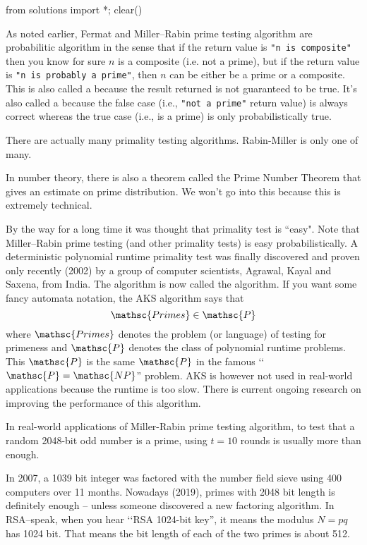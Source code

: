 \begin{python0}
from solutions import *; clear()
\end{python0}

As noted earlier, Fermat and Miller--Rabin prime testing algorithm
are probabilitic algorithm in the sense that if the
return value is \verb!"n is composite"! then you know for sure $n$ is a
composite (i.e. not a prime), 
but if the return value is
\verb!"n is probably a prime"!,
then $n$ can be either be a prime or a
composite.
This is also called a
because the result returned is not guaranteed to be true.
It's also called a  because the
false case (i.e., \verb!"not a prime"! return value) is always correct whereas the
true case (i.e., is a prime) is only probabilistically true.

There are actually many primality testing algorithms.
Rabin-Miller is only one of many.

In number theory, there is also a theorem called the Prime Number
Theorem that gives an estimate on prime distribution. We won't go
into this because this is extremely technical.

By the way for a long time it was thought that primality test is
``easy".
Note that Miller--Rabin prime testing (and other primality tests)
is easy probabilistically.
A deterministic polynomial runtime
primality test was finally discovered and proven only recently
(2002) by a group of computer scientists, Agrawal, Kayal and Saxena, from India.
The algorithm is now called the
algorithm.
If you want some fancy automata notation, the AKS algorithm
says that
\[
  \mathsc{Primes} \in \mathsc{P}
\]
where $\mathsc{Primes}$ denotes the problem (or language) of
testing for primeness and $\mathsc{P}$
denotes the class of polynomial runtime problems.
This $\mathsc{P}$ is the same $\mathsc{P}$ in the famous
\lq\lq$\mathsc{P} = \mathsc{NP}$'' problem.
AKS is however not used in real-world applications because the runtime
is too slow.
There is current ongoing research on improving the performance
of this algorithm.

In real-world applications of Miller-Rabin prime testing algorithm,
to test that a random 2048-bit odd number is a prime,
using $t = 10$ rounds is usually more than enough.

In 2007, a 1039 bit integer was factored with the number field sieve using
400 computers over 11 months.
Nowadays (2019), primes with 2048 bit length is definitely enough -- unless
someone discovered a new factoring algorithm.
In RSA--speak, when you hear \lq\lq RSA 1024-bit key'', it means
the modulus $N = pq$ has 1024 bit.
That means the bit length of each of the two primes is about 512.


